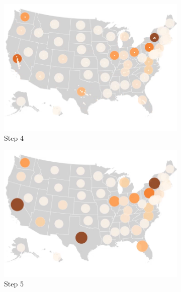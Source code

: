 \begin{figure}
    \begin{subfigure}[b]{0.31\textwidth}
        \centering
        \includegraphics[width=\textwidth]{images/results/dot_cartogram/transition_4.png}
        \caption[]%
        {{\small Step 4}}
    \end{subfigure}
    \hfill
    \begin{subfigure}[b]{0.31\textwidth}
        \centering
        \includegraphics[width=\textwidth]{images/results/dot_cartogram/transition_5.png}
        \caption[]%
        {{\small Step 5}}
    \end{subfigure}
    \hfill
    \begin{subfigure}[b]{0.31\textwidth}
        \centering

\end{subfigure}
\end{figure}
